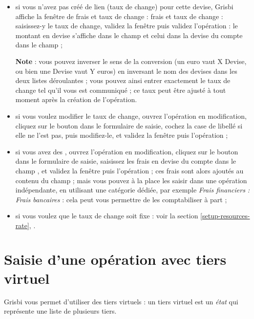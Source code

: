 \begin{itemize}
	 \item si vous n'avez pas créé de lien (taux de change) pour cette devise, Grisbi affiche la fenêtre de  \ifIllustration frais et taux de change  :
	 \else frais et taux de change :
	 \fi
	  saisissez-y le taux de change, validez la fenêtre puis validez l'opération : le montant en devise s'affiche dans le champ  et celui dans la devise du compte dans le champ  ;
	  
	  \textbf{Note} : vous pouvez inverser le sens de la conversion (un euro vaut X Devise, ou bien une Devise vaut Y euros) en inversant le nom des devises dans les deux listes déroulantes ; vous pouvez ainsi entrer exactement le taux de change tel qu'il vous est communiqué ; ce taux peut être ajusté à tout moment après la création de l'opération.
	 \item si vous voulez modifier le taux de change, ouvrez l'opération en modification, cliquez sur le bouton  dans le formulaire de saisie, cochez la case de libellé  si elle ne l'est pas, puis modifiez-le, et validez la fenêtre puis l'opération ;
	 \item si vous avez des , ouvrez l'opération en modification, cliquez sur le bouton  dans le formulaire de saisie, saisissez les frais en devise du compte dans le champ , et validez la fenêtre puis l'opération ; ces frais sont alors ajoutés au contenu du champ  ; mais vous pouvez à la place les saisir dans une opération indépendante, en utilisant une catégorie dédiée, par exemple \emph{Frais financiers : Frais bancaires} : cela peut vous permettre de les comptabiliser à part ;
	 \item si vous voulez que le taux de change soit fixe : voir la section \vref{setup-resources-rate}, .
\end{itemize}


\section{Saisie d'une opération avec tiers virtuel\label{transactions-virtualThird}}


Grisbi vous permet d'utiliser des tiers virtuels : un tiers virtuel est un \emph{état} qui représente une liste de plusieurs tiers.

